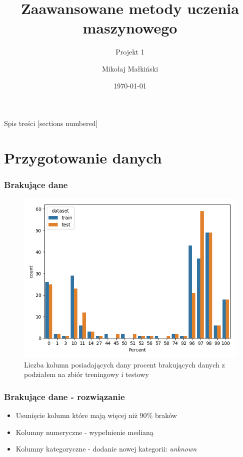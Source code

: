 \documentclass{beamer}
\title{
Zaawansowane metody uczenia maszynowego
}
\subtitle{
Projekt 1
}
\author{
Mikołaj Małkiński
}
\institute{
Politechnika Warszawska \\
Wydział Matematyki i Nauk Informacyjnych
}
\date{\today}
\begin{document}
    \maketitle

    \begin{frame}{Spis treści}
        [sections numbered]
        \tableofcontents[hideallsubsections]
    \end{frame}

    \section{Przygotowanie danych}

    \begin{frame}
        \frametitle{Brakujące dane}
        \begin{figure}
            \centering
            \includegraphics[width=0.8\linewidth]{../images/missing-data.png}
            \caption{Liczba kolumn posiadających dany procent brakujących danych z podziałem na zbiór treningowy i testowy}
            \label{fig:missing-data}
        \end{figure}
    \end{frame}

    \begin{frame}
        \frametitle{Brakujące dane - rozwiązanie}
        \begin{itemize}
            \item Usunięcie kolumn które mają więcej niż 90\% braków
            \item Kolumny numeryczne - wypełnienie medianą
            \item Kolumny kategoryczne - dodanie nowej kategorii: \textit{unknown}
        \end{itemize}
    \end{frame}
\end{document}
